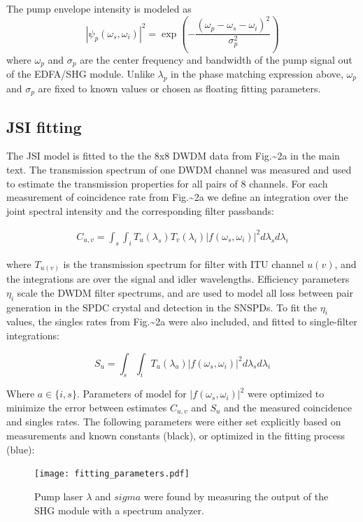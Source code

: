 \documentclass[11pt]{caltech_thesis} %
\begin{document}
The pump envelope intensity is modeled as
$$|\psi_p\left(\omega_s, \omega_i\right)|^2=\exp \left(-\frac{\left(\omega_p-\omega_s-\omega_i\right)^2}{\sigma_p^2}\right)$$ where $\omega_p$ and $\sigma_p$ are the center frequency and bandwidth of the pump signal out of the EDFA/SHG module. Unlike $\lambda_p$ in the phase matching expression above, $\omega_p$ and $\sigma_p$ are fixed to known values or chosen as floating fitting parameters.

\hypertarget{jsi-fitting}{%
\subsection{JSI fitting}\label{jsi-fitting}}

The JSI model is fitted to the the 8x8 DWDM data from Fig.\textasciitilde2a in the main text. The transmission spectrum of one DWDM channel was measured and used to estimate the transmission properties for all pairs of 8 channels. For each measurement of coincidence rate from Fig.\textasciitilde2a we define an integration over the joint spectral intensity and the corresponding filter passbands:

\begin{align}
    C_{u,v} = \int_{s}\int_{i}T_u(\lambda_s)T_v(\lambda_i)|f(\omega_s, \omega_i)|^2 d\lambda_s d\lambda_i \label{C_uv}
\end{align}

where $T_{u(v)}$ is the transmission spectrum for filter with ITU channel $u (v)$, and the integrations are over the signal and idler wavelengths. Efficiency parameters $\eta_i$ scale the DWDM filter spectrums, and are used to model all loss between pair generation in the SPDC crystal and detection in the SNSPDs. To fit the $\eta_i$ values, the singles rates from Fig.\textasciitilde2a were also included, and fitted to single-filter integrations:

$$S_{u} = \int_{s}\int_{i}T_{u}(\lambda_a)|f(\omega_s, \omega_i)|^2 d\lambda_s d\lambda_i$$

Where $a \in \{i, s\}$. Parameters of model for $|f(\omega_s, \omega_i)|^2$ were optimized to minimize the error between estimates $C_{u,v}$ and $S_u$ and the measured coincidence and singles rates. The following parameters were either set explicitly based on measurements and known constants (black), or optimized in the fitting process (blue):

\begin{figure}[H]
    \centering
    \texttt{[image: fitting\_parameters.pdf]}
    \caption{Pump laser $\lambda$ and $sigma$ were found by measuring the output of the SHG module with a spectrum analyzer. }
    \label{fig:parameters}
\end{figure}
\end{document}
